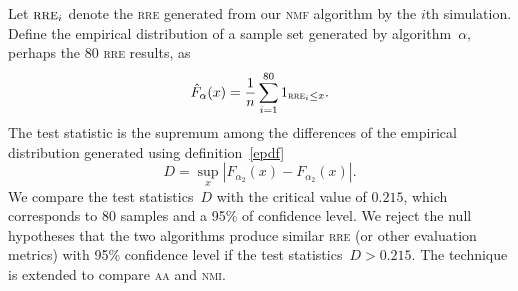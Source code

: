 Let $\textsc{rre}_i$ denote the \textsc{rre} generated from our \textsc{nmf} algorithm by the $i$th simulation. Define the empirical distribution of a sample set generated by algorithm~$\alpha$, perhaps the $80$ \textsc{rre} results, as
\begin{equation}\label{epdf}
  \hat{F}_{\alpha}(x)=\frac{1}{n}\sum_{i=1}^{80}1_{\textsc{rre}_i \leq x}.
\end{equation}
The test statistic is the supremum among the differences of the empirical distribution generated using definition~\eqref{epdf} \citep{Walck:1996cca}
\begin{equation}
D=\sup _{x}\left|F_{\alpha_2}(x)-F_{\alpha_2}(x)\right|.
\end{equation}
We compare the test statistics~$D$ with the critical value of $0.215$, which corresponds to $80$ samples and a 95\% of confidence level. We reject the null hypotheses that the two algorithms produce similar \textsc{rre} (or other evaluation metrics) with 95\% confidence level if the test statistics~$D>0.215$. The technique is extended to compare \textsc{aa} and \textsc{nmi}.
